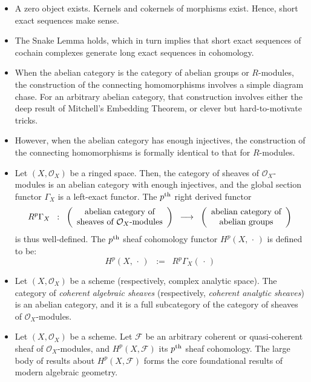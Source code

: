 \begin{itemize}
\item
	A zero object exists.
	Kernels and cokernels of morphisms exist.
	Hence, short exact sequences make sense.
\item
	The Snake Lemma holds, which in turn implies that
	short exact sequences of cochain complexes generate long exact sequences in cohomology.
\item
	When the abelian category is the category of abelian groups or $R$-modules,
	the construction of the connecting homomorphisms involves a simple diagram chase.
	For an arbitrary abelian category, that construction involves either the deep result
	of Mitchell's Embedding Theorem, or clever but hard-to-motivate tricks.
\item
	However, when the abelian category has enough injectives,
	the construction of the connecting homomorphisms is formally identical to
	that for $R$-modules. 
\item
	Let $(X,\mathcal{O}_{X})$ be a ringed space.
	Then, the category of sheaves of $\mathcal{O}_{X}$-modules
	is an abelian category with enough injectives, and
	the global section functor $\Gamma_{X}$ is a left-exact functor.
	The $p^{\textnormal{th}}$ right derived functor
	\begin{equation*}
	R^{p}\Gamma_{X}
	\;\; : \;\;
	\left(\begin{array}{c} \textnormal{abelian category of} \\ \textnormal{sheaves of $\mathcal{O}_{X}$-modules} \end{array}\right)
	\;\;\longrightarrow\;\;
	\left(\begin{array}{c} \textnormal{abelian category of} \\ \textnormal{abelian groups} \end{array}\right)
	\end{equation*}
	is thus well-defined.
	The $p^{\textnormal{th}}$ sheaf cohomology functor $H^{p}(X,\,\cdot\,)$ is defined to be:
	\begin{equation*}
	H^{p}(X,\,\cdot\,)
	\;\; := \;\;
		R^{p}\Gamma_{X}(\,\cdot\,)
	\end{equation*}
\item
	Let $(X,\mathcal{O}_{X})$ be a scheme (respectively, complex analytic space).
	The category of \textit{coherent algebraic sheaves} (respectively, \textit{coherent analytic sheaves})
	is an abelian category, and it is a full subcategory of the category of sheaves of $\mathcal{O}_{X}$-modules.
\item
	Let $(X,\mathcal{O}_{X})$ be a scheme.
	Let $\mathcal{F}$ be an arbitrary coherent or quasi-coherent sheaf of $\mathcal{O}_{X}$-modules,
	and $H^{p}(X,\mathcal{F})$ its $p^{\textnormal{th}}$ sheaf cohomology.
	The large body of results about $H^{p}(X,\mathcal{F})$ forms the core foundational results of modern algebraic geometry.
\end{itemize}

